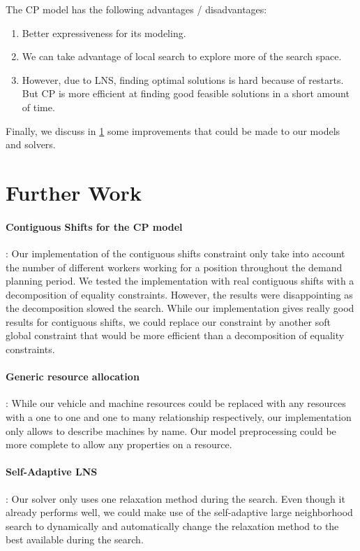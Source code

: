 \documentclass[../thesis.tex]{subfiles}
\begin{document}
The CP model has the following advantages / disadvantages:
\begin{enumerate}[leftmargin=1.5cm]
  \item Better expressiveness for its modeling.
  \item We can take advantage of local search to explore more of the search space.
  \item However, due to LNS, finding optimal solutions is hard because of restarts. But CP is more efficient at 
  finding good feasible solutions in a short amount of time.
\end{enumerate}



Finally, we discuss in \ref{further-work} some improvements that could be made to our models and solvers.

\section{Further Work}
\label{further-work}

\paragraph{Contiguous Shifts for the CP model}: Our implementation of the contiguous shifts constraint only take into account 
the number of different workers working for a position throughout the demand planning period.
We tested the implementation with real contiguous shifts with a decomposition of equality constraints. However, the results 
were disappointing as the decomposition slowed the search. While our implementation gives really good results for contiguous shifts,
we could replace our constraint by another soft global constraint that would be more efficient than 
a decomposition of equality constraints.

\paragraph{Generic resource allocation}: While our vehicle and machine resources could be replaced with 
any resources with a one to one and one to many relationship respectively, our implementation only allows to describe
machines by name. Our model preprocessing could be more complete to allow any properties on a resource.

\paragraph{Self-Adaptive LNS}: Our solver only uses one relaxation method during the search. 
Even though it already performs well, we could make 
use of the self-adaptive large neighborhood search \cite{thomas:adaptive} to dynamically 
and automatically change the relaxation method to the best available during the search.
\end{document}
